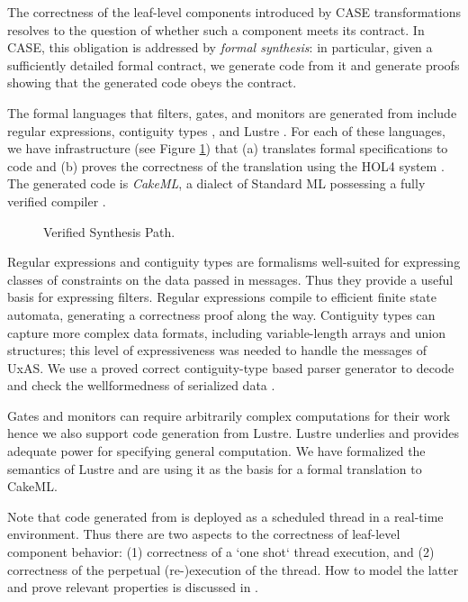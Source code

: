 The correctness of the leaf-level components introduced by CASE
transformations resolves to the question of whether such a component
meets its \agree{} contract. In CASE, this obligation is addressed by
\emph{formal synthesis}: in particular, given a sufficiently detailed
formal contract, we generate code from it and generate proofs showing
that the generated code obeys the contract.

The formal languages that filters, gates, and monitors are generated
from include regular expressions, contiguity types
\cite{contiguity-types}, and Lustre \cite{lustre}. For each of these
languages, we have infrastructure (see Figure \ref{fig:synthesis})
that (a) translates formal specifications to code and (b) proves the
correctness of the translation using the HOL4 system
\cite{hol4:overview}. The generated code is \emph{CakeML}, a dialect
of Standard ML \cite{SML97} possessing a fully verified compiler
\cite{cakeml}.

\begin{figure}[h]
\begin{center}
\end{center}
\caption{Verified Synthesis Path.\label{fig:synthesis}}
\end{figure}

Regular expressions and contiguity types are formalisms well-suited
for expressing classes of constraints on the data passed in
messages. Thus they provide a useful basis for expressing
filters. Regular expressions compile to efficient finite state
automata, generating a correctness proof along the
way\cite{case-verified-filter}. Contiguity types can capture more
complex data formats, including variable-length arrays and union
structures; this level of expressiveness was needed to handle the
messages of UxAS. We use a proved correct contiguity-type based parser
generator to decode and check the wellformedness of serialized data
\cite{contiguity-types}.

Gates and monitors can require arbitrarily complex computations for
their work hence we also support code generation from Lustre. Lustre
underlies \agree{} and provides adequate power for specifying general
computation. We have formalized the semantics of Lustre and are using
it as the basis for a formal translation to CakeML.

Note that code generated from \splat{} is deployed as a scheduled
thread in a real-time environment. Thus there are two aspects to the
correctness of leaf-level component behavior: (1) correctness of a
`one shot` thread execution, and (2) correctness of the perpetual
(re-)execution of the thread. How to model the latter and prove
relevant properties is discussed in \cite{johannes:repeat}.
